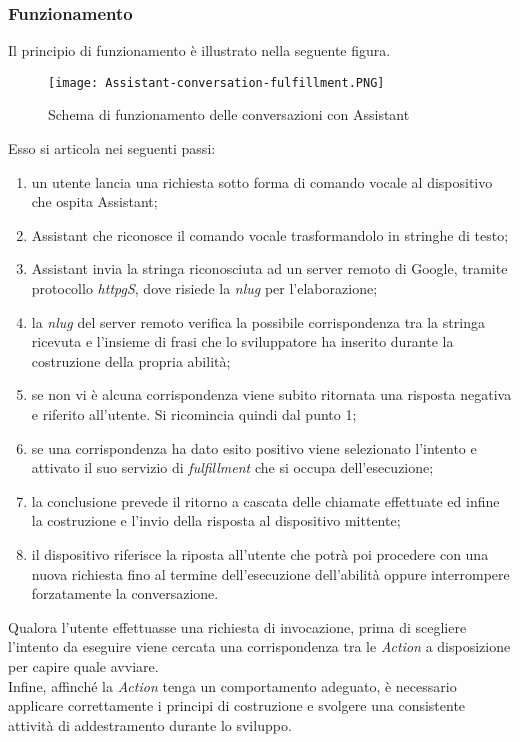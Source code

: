 		\subsubsection{Funzionamento}
		Il principio di funzionamento è illustrato nella seguente figura.
		\pagebreak
				
		\begin{figure}[htbp]
			\begin{center}
				\texttt{[image: Assistant-conversation-fulfillment.PNG]}
				\caption{Schema di funzionamento delle conversazioni con Assistant}
			\end{center}
		\end{figure}
		
		Esso si articola nei seguenti passi:
		\begin{enumerate}
			\item un utente lancia una richiesta sotto forma di comando vocale al dispositivo che ospita Assistant;
			\item Assistant che riconosce il comando vocale trasformandolo in stringhe di testo;
			\item Assistant invia la stringa riconosciuta ad un server remoto di Google, tramite protocollo \emph{\gls{httpg}S}\glsfirstoccur, dove risiede la \emph{\gls{nlug}} per l'elaborazione;
			\item la \emph{\gls{nlug}} del server remoto verifica la possibile corrispondenza tra la stringa ricevuta e l'insieme di frasi che lo sviluppatore ha inserito durante la costruzione della propria abilità;
			\item se non vi è alcuna corrispondenza viene subito ritornata una risposta negativa e riferito all'utente. Si ricomincia quindi dal punto 1;
			\item se una corrispondenza ha dato esito positivo viene selezionato l'intento e attivato il suo servizio di \emph{fulfillment} che si occupa dell'esecuzione;
			\item la conclusione prevede il ritorno a cascata delle chiamate effettuate ed infine la costruzione e l'invio della risposta al dispositivo mittente;
			\item il dispositivo riferisce la riposta all'utente che potrà poi procedere con una nuova richiesta fino al termine dell'esecuzione dell'abilità oppure interrompere forzatamente la conversazione.
		\end{enumerate}
		Qualora l'utente effettuasse una richiesta di invocazione, prima di scegliere l'intento da eseguire viene cercata una corrispondenza tra le \emph{Action} a disposizione per capire quale avviare. \\
		Infine, affinché la \emph{Action} tenga un comportamento adeguato, è necessario applicare correttamente i principi di costruzione e svolgere una consistente attività di addestramento durante lo sviluppo.
